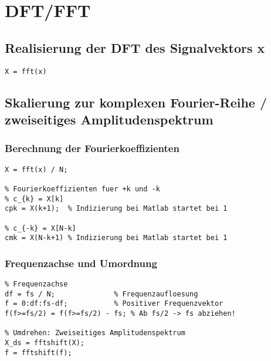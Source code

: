 \documentclass[threecolumn, 5pt, german]{latex4ei/latex4ei_sheet}
\begin{document}
	\section{DFT/FFT}
	
	\begin{sectionbox}
	
		\subsection{Realisierung der DFT des Signalvektors x}
		
		\begin{lstlisting}
X = fft(x) 
		\end{lstlisting}
	\end{sectionbox}
	
	\begin{sectionbox}
	
		\subsection{Skalierung zur komplexen Fourier-Reihe / zweiseitiges Amplitudenspektrum}
		
		\subsubsection{Berechnung der Fourierkoeffizienten}
		
		\begin{lstlisting}
X = fft(x) / N;

% Fourierkoeffizienten fuer +k und -k
% c_{k} = X[k]
cpk = X(k+1);  % Indizierung bei Matlab startet bei 1

% c_{-k} = X[N-k]
cmk = X(N-k+1) % Indizierung bei Matlab startet bei 1
		\end{lstlisting}

		\subsubsection{Frequenzachse und Umordnung}
		
		\begin{lstlisting}
% Frequenzachse
df = fs / N;              % Frequenzaufloesung
f = 0:df:fs-df;           % Positiver Frequenzvektor
f(f>=fs/2) = f(f>=fs/2) - fs; % Ab fs/2 -> fs abziehen!

% Umdrehen: Zweiseitiges Amplitudenspektrum
X_ds = fftshift(X);
f = fftshift(f);
		\end{lstlisting}
	\end{sectionbox}
	
\end{document}
